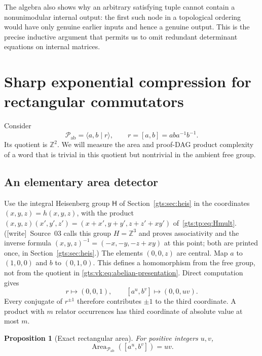 \documentclass[11pt,letterpaper]{article}
\newtheorem{proposition}[theorem]{Proposition}
\theoremstyle{definition}
\theoremstyle{remark}
\newcommand{\Z}{\mathbb Z}
\newcommand{\Pp}{\mathcal P}
\newcommand{\Area}{\operatorname{Area}}
\newcommand{\HH}{\mathsf H}
\newcommand{\wtag}{\textup{[write]}}
\begin{document}
The algebra also shows why an arbitrary satisfying tuple cannot contain a nonunimodular internal output: the first such node in a topological ordering would have only genuine earlier inputs and hence a genuine output. This is the precise inductive argument that permits us to omit redundant determinant equations on internal matrices.

\section{Sharp exponential compression for rectangular commutators}\label{gts:vk:sec:grid}

Consider
\begin{equation}\label{gts:vk:eq:abelian-presentation}
 \Pp_{\mathrm{ab}}=\langle a,b\mid r\rangle,
 \qquad r=[a,b]=aba^{-1}b^{-1}.
\end{equation}
Its quotient is $\Z^2$. We will measure the area and proof-DAG product complexity of a word that is trivial in this quotient but nontrivial in the ambient free group.

\subsection{An elementary area detector}

Use the integral Heisenberg group $\HH$ of Section~\ref{gts:sec:heis} in the coordinates $(x,y,z)=h(x,y,z)$, with the product $(x,y,z)(x',y',z')=(x+x',y+y',z+z'+xy')$ of~\eqref{gts:tp:eq:Hmult}. (\wtag\ Source~03 calls this group $H=\Z^3$ and proves associativity and the inverse formula $(x,y,z)^{-1}=(-x,-y,-z+xy)$ at this point; both are printed once, in Section~\ref{gts:sec:heis}.) The elements $(0,0,z)$ are central. Map $a$ to $(1,0,0)$ and $b$ to $(0,1,0)$. This defines a homomorphism from the free group, not from the quotient in \eqref{gts:vk:eq:abelian-presentation}. Direct computation gives
\begin{equation}\label{gts:vk:eq:heisenberg}
 r\longmapsto(0,0,1),\qquad
 [a^u,b^v]\longmapsto(0,0,uv).
\end{equation}
Every conjugate of $r^{\pm1}$ therefore contributes $\pm1$ to the third coordinate. A product with $m$ relator occurrences has third coordinate of absolute value at most $m$.

\begin{proposition}[Exact rectangular area]\label{gts:vk:prop:rectangle-area}
For positive integers $u,v$,
\begin{equation}\label{gts:vk:eq:rectangle-area}
 \Area_{\Pp_{\mathrm{ab}}}([a^u,b^v])=uv.
\end{equation}
\end{proposition}
\end{document}
